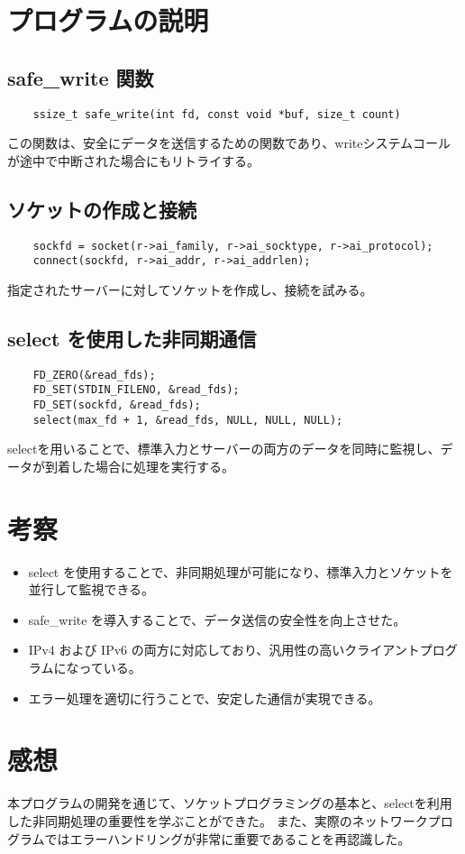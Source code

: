 \documentclass{jlreq}
\begin{document}
\section{プログラムの説明}

\subsection{safe_write 関数}

\begin{verbatim}
    ssize_t safe_write(int fd, const void *buf, size_t count)
\end{verbatim}

この関数は、安全にデータを送信するための関数であり、writeシステムコールが途中で中断された場合にもリトライする。

\subsection{ソケットの作成と接続}

\begin{verbatim}
    sockfd = socket(r->ai_family, r->ai_socktype, r->ai_protocol);
    connect(sockfd, r->ai_addr, r->ai_addrlen);
\end{verbatim}

指定されたサーバーに対してソケットを作成し、接続を試みる。

\subsection{select を使用した非同期通信}

\begin{verbatim}
    FD_ZERO(&read_fds);
    FD_SET(STDIN_FILENO, &read_fds);
    FD_SET(sockfd, &read_fds);
    select(max_fd + 1, &read_fds, NULL, NULL, NULL);
\end{verbatim}

selectを用いることで、標準入力とサーバーの両方のデータを同時に監視し、データが到着した場合に処理を実行する。

\section{考察}
\begin{itemize}
    \item  select を使用することで、非同期処理が可能になり、標準入力とソケットを並行して監視できる。
    \item  safe_write を導入することで、データ送信の安全性を向上させた。
    \item IPv4 および IPv6 の両方に対応しており、汎用性の高いクライアントプログラムになっている。
    \item エラー処理を適切に行うことで、安定した通信が実現できる。
\end{itemize}

\section{感想}

本プログラムの開発を通じて、ソケットプログラミングの基本と、selectを利用した非同期処理の重要性を学ぶことができた。
また、実際のネットワークプログラムではエラーハンドリングが非常に重要であることを再認識した。
\end{document}
